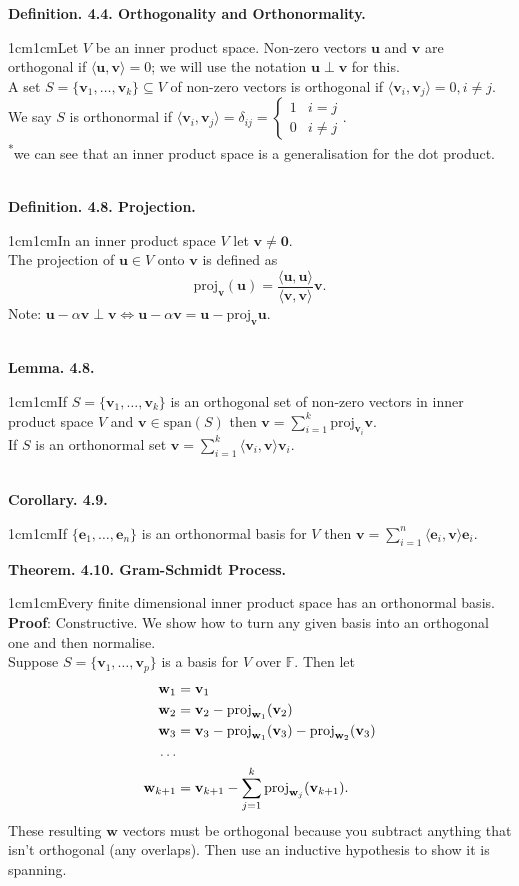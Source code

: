 \documentclass{article}
\newcommand{\vect}[1]{\mathbf{#1}}
\newcommand{\definition}[2]{\textbf{Definition. #1.}\begin{adjustwidth}{1cm}{1cm}#2\end{adjustwidth}}
\newcommand{\theorem}[2]{\textbf{Theorem. #1.}\begin{adjustwidth}{1cm}{1cm}#2\end{adjustwidth}}
\newcommand{\lemma}[2]{\textbf{Lemma. #1.}\begin{adjustwidth}{1cm}{1cm}#2\end{adjustwidth}}
\newcommand{\corollary}[2]{\textbf{Corollary. #1.}\begin{adjustwidth}{1cm}{1cm}#2\end{adjustwidth}}
\begin{document}
\definition{4.4. Orthogonality and Orthonormality}{Let $V$ be an inner product space. Non-zero vectors $\vect{u}$ and $\vect{v}$ are orthogonal if $\langle \vect{u}, \vect{v} \rangle = 0$; we will use the notation $\vect{u} \perp \vect{v}$ for this.\\A set $S = \{ \vect{v}_1, \ldots , \vect{v}_k \} \subseteq V$ of non-zero vectors is orthogonal if $\langle \vect{v}_i, \vect{v}_j \rangle = 0, i \neq j$.\\We say $S$ is orthonormal if $\langle \vect{v}_i, \vect{v}_j \rangle = \delta_{ij} = \begin{cases} 1 & i=j \\ 0 & i \neq j \end{cases}$.\\[1\baselineskip]\textsuperscript{*}we can see that an inner product space is a generalisation for the dot product.}~\\
\definition{4.8. Projection}{In an inner product space $V$ let $\vect{v} \neq \vect{0}$.\\The projection of $\vect{u} \in V$ onto $\vect{v}$ is defined as \[ \text{proj}_\vect{v}(\vect{u}) = \frac{\langle \vect{u}, \vect{u} \rangle}{\langle \vect{v}, \vect{v} \rangle} \vect{v}.\]Note: $\vect{u} - \alpha \vect{v} \perp \vect{v} \iff \vect{u} - \alpha \vect{v} = \vect{u} - \text{proj}_\vect{v} \vect{u}$.}~\\
\lemma{4.8}{If $S = \{ \vect{v}_1, \ldots, \vect{v}_k \}$ is an orthogonal set of non-zero vectors in inner product space $V$ and $\vect{v} \in \text{span}(S)$ then $\vect{v} = \sum_{i=1}^k \text{proj}_{\vect{v}_i} \vect{v}$.\\If $S$ is an orthonormal set $\vect{v} = \sum_{i=1}^k \langle \vect{v}_i, \vect{v} \rangle \vect{v}_i$.}~\\
\corollary{4.9}{If $\{ \vect{e}_1, \ldots , \vect{e}_n \}$ is an orthonormal basis for $V$ then $\vect{v} = \sum_{i=1}^n \langle \vect{e}_i, \vect{v} \rangle \vect{e}_i$.}\newpage
\theorem{4.10. Gram-Schmidt Process}{Every finite dimensional inner product space has an orthonormal basis.\\\textbf{Proof}: Constructive. We show how to turn any given basis into an orthogonal one and then normalise.\\[1\baselineskip]
Suppose $S = \{ \vect{v}_1, \ldots, \vect{v}_p \}$ is a basis for $V$ over $\mathbb{F}$. Then let
\begin{align*}
  \vect{w}_1 &= \vect{v}_1 \notag \\
  \vect{w}_2 &= \vect{v}_2 - \text{proj}_{\vect{w}_1}(\vect{v}_2) \notag \\
  \vect{w}_3 &= \vect{v}_3 - \text{proj}_{\vect{w}_1}(\vect{v}_3) - \text{proj}_{\vect{w}_2}(\vect{v}_3) \notag \\
  \ldots \notag \\
  \vect{w}_{k+1} &= \vect{v}_{k+1} - \sum_{j=1}^k \text{proj}_{\vect{w}_j} (\vect{v}_{k+1}). \notag
\end{align*}
These resulting $\vect{w}$ vectors must be orthogonal because you subtract anything that isn't orthogonal (any overlaps). Then use an inductive hypothesis to show it is spanning.}
\end{document}
